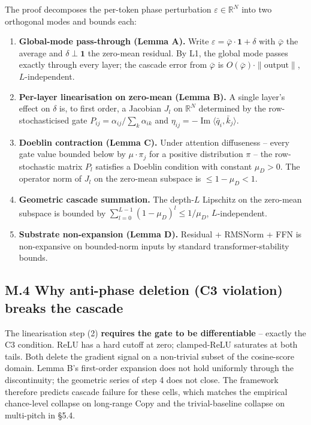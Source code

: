 \documentclass[11pt,a4paper]{article}
\theoremstyle{plain}
\theoremstyle{definition}
\renewcommand{\Im}{\operatorname{Im}}
\begin{document}
The proof decomposes the per-token phase perturbation $\varepsilon \in \mathbb{R}^N$ into two orthogonal modes and bounds each:

\begin{enumerate}
  \item \textbf{Global-mode pass-through (Lemma A).} Write $\varepsilon = \bar\varphi \cdot \mathbf{1} + \delta$ with $\bar\varphi$ the average and $\delta \perp \mathbf{1}$ the zero-mean residual. By L1, the global mode passes exactly through every layer; the cascade error from $\bar\varphi$ is $O(\bar\varphi) \cdot \|\text{output}\|$, $L$-independent.
  \item \textbf{Per-layer linearisation on zero-mean (Lemma B).} A single layer's effect on $\delta$ is, to first order, a Jacobian $J_l$ on $\mathbb{R}^N$ determined by the row-stochasticised gate $P_{ij} = \alpha_{ij}/\sum_k \alpha_{ik}$ and $\eta_{ij} = -\Im\langle \bar q_i, \bar k_j\rangle$.
  \item \textbf{Doeblin contraction (Lemma C).} Under attention diffuseness -- every gate value bounded below by $\mu \cdot \pi_j$ for a positive distribution $\pi$ -- the row-stochastic matrix $P_l$ satisfies a Doeblin condition with constant $\mu_D > 0$. The operator norm of $J_l$ on the zero-mean subspace is $\le 1 - \mu_D < 1$.
  \item \textbf{Geometric cascade summation.} The depth-$L$ Lipschitz on the zero-mean subspace is bounded by $\sum_{l=0}^{L-1}(1-\mu_D)^l \le 1/\mu_D$, $L$-independent.
  \item \textbf{Substrate non-expansion (Lemma D).} Residual + RMSNorm + FFN is non-expansive on bounded-norm inputs by standard transformer-stability bounds.
\end{enumerate}

\subsection*{M.4 Why anti-phase deletion (C3 violation) breaks the cascade}
The linearisation step (2) \textbf{requires the gate to be differentiable} -- exactly the C3 condition. ReLU has a hard cutoff at zero; clamped-ReLU saturates at both tails. Both delete the gradient signal on a non-trivial subset of the cosine-score domain. Lemma B's first-order expansion does not hold uniformly through the discontinuity; the geometric series of step 4 does not close. The framework therefore predicts cascade failure for these cells, which matches the empirical chance-level collapse on long-range Copy and the trivial-baseline collapse on multi-pitch in \S{}5.4.
\end{document}
